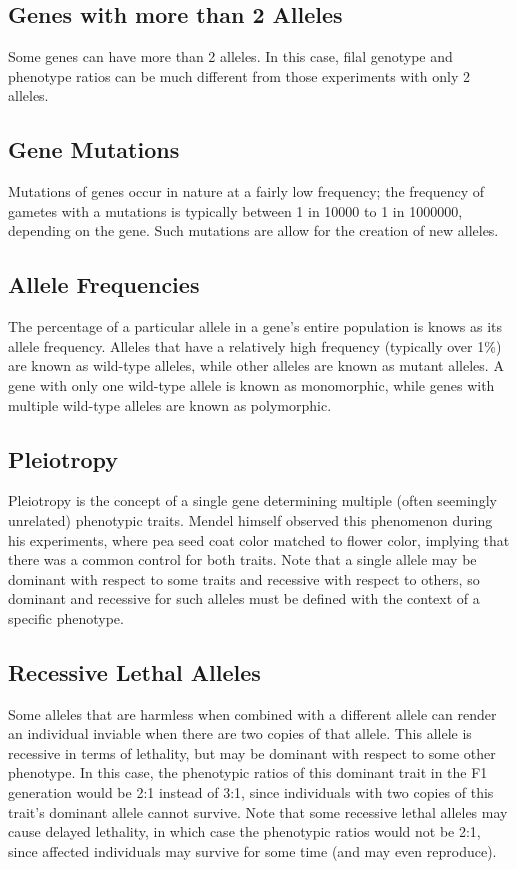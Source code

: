 \documentclass[12pt,titlepage]{article}
\begin{document}
      \subsection{Genes with more than 2 Alleles}
        Some genes can have more than 2 alleles. In this case, filal genotype and phenotype ratios can be much different from those experiments with only
        2 alleles.

      \subsection{Gene Mutations}
        Mutations of genes occur in nature at a fairly low frequency; the frequency of gametes with a mutations is typically between 1 in 10000 to 1 in 1000000,
        depending on the gene. Such mutations are allow for the creation of new alleles.

      \subsection{Allele Frequencies}
        The percentage of a particular allele in a gene's entire population is knows as its allele frequency. Alleles that have a relatively high frequency
        (typically over 1\%) are known as wild-type alleles, while other alleles are known as mutant alleles. A gene with only one wild-type allele is known
        as monomorphic, while genes with multiple wild-type alleles are known as polymorphic.

      \subsection{Pleiotropy}
        Pleiotropy is the concept of a single gene determining multiple (often seemingly unrelated) phenotypic traits. Mendel himself observed this phenomenon
        during his experiments, where pea seed coat color matched to flower color, implying that there was a common control for both traits. Note that a single
        allele may be dominant with respect to some traits and recessive with respect to others, so dominant and recessive for such alleles must be defined
        with the context of a specific phenotype.

      \subsection{Recessive Lethal Alleles}
        Some alleles that are harmless when combined with a different allele can render an individual inviable when there are two copies of that allele. This
        allele is recessive in terms of lethality, but may be dominant with respect to some other phenotype. In this case, the phenotypic ratios of this dominant
        trait in the F1 generation would be 2:1 instead of 3:1, since individuals with two copies of this trait's dominant allele cannot survive. Note that some
        recessive lethal alleles may cause delayed lethality, in which case the phenotypic ratios would not be 2:1, since affected individuals may survive for
        some time (and may even reproduce).
\end{document}

